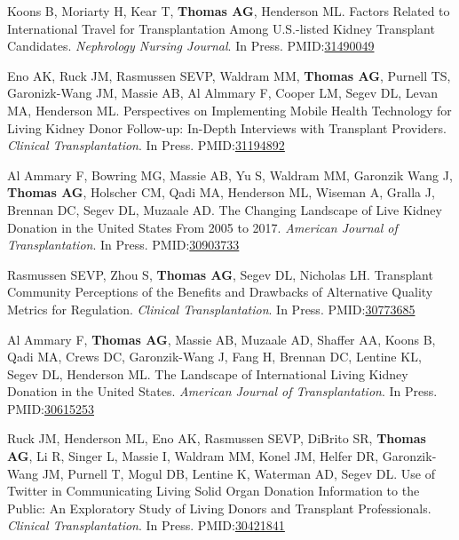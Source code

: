 \documentclass[10pt]{article}
\makeatletter
\newlength{\bibhang}
\newlength{\bibsep}
 {\@listi \global\bibsep\itemsep \global\advance\bibsep by\parsep}
\newenvironment{bibenum*}
  {\renewcommand\labelenumi{[\theenumi]}%
   \etaremune[
     topsep=0pt,
     itemsep=\bibsep,
     parsep=0pt,partopsep=0pt,
     itemindent=-\bibhang,
     leftmargin={\bibhang+\widthof{[999]}}]}
  {\endetaremune}
\newcommand{\pmid}[1]{PMID:\href{https://www.ncbi.nlm.nih.gov/pubmed/#1}{#1}}
\makeatother
\begin{document}
\begin{bibenum*}
\item Koons B, Moriarty H, Kear T, \textbf{Thomas AG}, Henderson ML.
  Factors Related to International Travel for Transplantation Among U.S.-listed
  Kidney Transplant Candidates.
  \emph{Nephrology Nursing Journal}. In Press.
  \pmid{31490049} %

\item Eno AK, Ruck JM, Rasmussen SEVP, Waldram MM, \textbf{Thomas AG},
  Purnell TS, Garonizk-Wang JM, Massie AB, Al Almmary F, Cooper LM,
  Segev DL, Levan MA, Henderson ML.
  Perspectives on Implementing Mobile Health Technology for Living Kidney
  Donor Follow-up: In-Depth Interviews with Transplant Providers.
  \emph{Clinical Transplantation}. In Press.
  \pmid{31194892} 

\item Al Ammary F, Bowring MG, Massie AB, Yu S, Waldram MM, Garonzik Wang J,
  \textbf{Thomas AG}, Holscher CM, Qadi MA, Henderson ML, Wiseman A,
  Gralla J, Brennan DC, Segev DL, Muzaale AD.
  The Changing Landscape of Live Kidney Donation in the United States
  From 2005 to 2017.
  \emph{American Journal of Transplantation}. In Press.
  \pmid{30903733} 

\item Rasmussen SEVP, Zhou S, \textbf{Thomas AG},
  Segev DL, Nicholas LH.
  Transplant Community Perceptions of the Benefits and Drawbacks of
  Alternative Quality Metrics for Regulation.
  \emph{Clinical Transplantation}. In Press.
  \pmid{30773685} 

\item Al Ammary F\dag, \textbf{Thomas AG\dag}, Massie AB, Muzaale AD,
  Shaffer AA, Koons B, Qadi MA, Crews DC, Garonzik-Wang J,
  Fang H, Brennan DC, Lentine KL, Segev DL, Henderson ML.
  The Landscape of International Living Kidney Donation in the United States.
  \emph{American Journal of Transplantation}. In Press.
  \pmid{30615253} 

\item Ruck JM\dag, Henderson ML\dag, Eno AK, Rasmussen SEVP,
  DiBrito SR, \textbf{Thomas AG}, Li R, Singer L, Massie I, Waldram MM,
  Konel JM, Helfer DR, Garonzik-Wang JM, Purnell T,
  Mogul DB, Lentine K, Waterman AD, Segev DL.
  Use of Twitter in Communicating Living Solid Organ Donation Information
  to the Public: An Exploratory Study of Living Donors and
  Transplant Professionals.
  \emph{Clinical Transplantation}. In Press.
  \pmid{30421841} 


\end{bibenum*}
\end{document}

